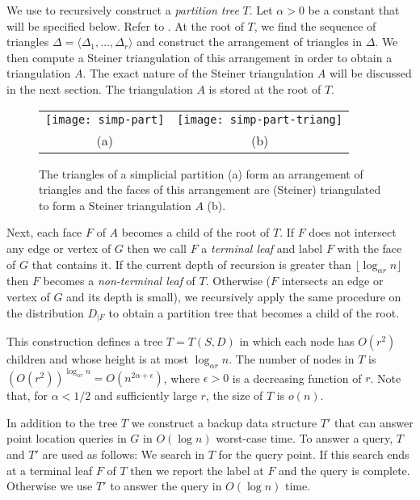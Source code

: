 \documentclass{patmorin}
\begin{document}
We use  to recursively construct a \emph{partition
tree} $T$.  Let $\alpha > 0$ be a constant that will be specified
below.  Refer to . At the root of $T$, we find the
sequence of triangles $\Delta=\langle\Delta_1,\ldots,\Delta_r\rangle$ and construct
the arrangement of triangles in $\Delta$.  We then compute a Steiner
triangulation of this arrangement in order to obtain a triangulation
$A$. The exact nature of the Steiner triangulation $A$ will be discussed
in the next section.  The triangulation $A$ is stored at the root of
$T$.

\begin{figure}
  \begin{center}
    \begin{tabular}{cc}
      \texttt{[image: simp-part]} & \texttt{[image: simp-part-triang]} \\
      (a) & (b)
    \end{tabular}
  \end{center}
  \caption{The triangles of a simplicial partition (a) form an arrangement of
    triangles and the faces of this arrangement are (Steiner) triangulated
    to form a Steiner triangulation $A$ (b).}
\end{figure}

Next, each face $F$ of $A$ becomes a child of the root of $T$.  If $F$
does not intersect any edge or vertex of $G$ then we call $F$ a
\emph{terminal leaf} and label $F$ with the face of $G$ that contains it.
If the current depth of recursion is greater than $\lfloor\log_{\alpha r}
n\rfloor$ then $F$ becomes a \emph{non-terminal leaf} of $T$.  Otherwise
($F$ intersects an edge or vertex of $G$ and its depth is small),
we recursively apply the same procedure on the distribution $D_{|F}$
to obtain a partition tree that becomes a child of the root.

This construction defines a tree $T=T(S,D)$ in which each node has
$O(r^2)$ children and whose height is at most $\log_{\alpha r} n$.
The number of nodes in $T$ is $(O(r^2))^{\log_{\alpha r} n} =
O(n^{2\alpha+\epsilon})$, where $\epsilon>0$ is a decreasing function
of $r$.  Note that, for $\alpha < 1/2$ and sufficiently large $r$,
the size of $T$ is $o(n)$.

In addition to the tree $T$ we construct a backup data structure $T'$ that
can answer point location queries in $G$ in $O(\log n)$ worst-case time.
To answer a query, $T$ and $T'$ are used as follows:  We search in $T$
for the query point. If this search ends at a terminal leaf $F$ of $T$
then we report the label at $F$ and the query is complete.  Otherwise we
use $T'$ to answer the query in $O(\log n)$ time.
\end{document}
